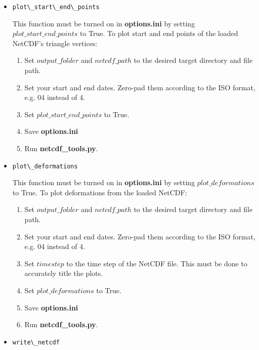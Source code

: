 \documentclass{article}
\begin{document}
        \begin{itemize}
            \item{} \verb?plot\_start\_end\_points?

            This function must be turned on in \textbf{options.ini} by setting $plot\_start\_end\_points$ to True. To plot start and end points of the loaded NetCDF's triangle vertices:
            \begin{enumerate}
                \item Set $output\_folder$ and $netcdf\_path$ to the desired target directory and file path.
                \item Set your start and end dates. Zero-pad them according to the ISO format, e.g. 04 instead of 4.
                \item Set $plot\_start\_end\_points$ to True.
                \item Save \textbf{options.ini}
                \item Run \textbf{netcdf\_tools.py}.
            \end{enumerate}

            \item{} \verb?plot\_deformations?

            This function must be turned on in \textbf{options.ini} by setting $plot\_deformations$ to True. To plot deformations from the loaded NetCDF:
            \begin{enumerate}
                \item Set $output\_folder$ and $netcdf\_path$ to the desired target directory and file path.
                \item Set your start and end dates. Zero-pad them according to the ISO format, e.g. 04 instead of 4.
                \item Set $timestep$ to the time step of the NetCDF file. This must be done to accurately title the plots.
                \item Set $plot\_deformations$ to True.
                \item Save \textbf{options.ini}
                \item Run \textbf{netcdf\_tools.py}.
            \end{enumerate}

            \item{} \verb?write\_netcdf?


\end{itemize}
\end{document}
